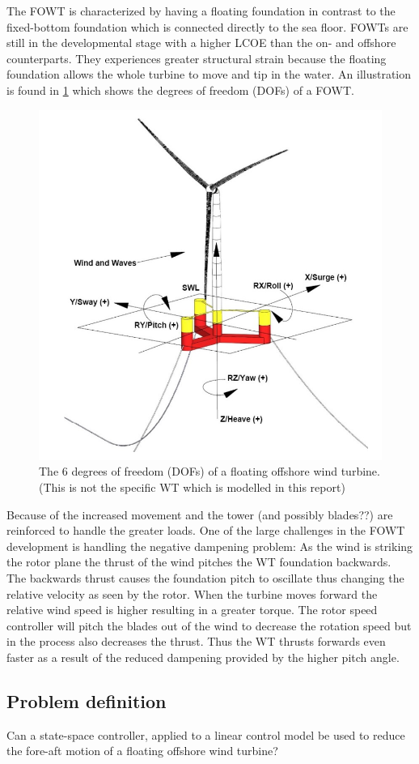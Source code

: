 The FOWT is characterized by having a floating foundation in contrast to the fixed-bottom foundation which is connected directly to the sea floor. FOWTs are still in the developmental stage with a higher LCOE than the on- and offshore counterparts. They experiences greater structural strain because the floating foundation allows the whole turbine to move and tip in the water. An illustration is found in \cref{fig:fowt_coordinates} which shows the degrees of freedom (DOFs) of a FOWT. 
\begin{figure}[h]
	\centering
	\includegraphics[width=0.55\linewidth]{Graphics/FOWTcoordinates.png}
	\caption{The 6 degrees of freedom (DOFs) of a floating offshore wind turbine. (This is not the specific WT which is modelled in this report) \cite{Vanelli2021}}
	\label{fig:fowt_coordinates}
\end{figure}
Because of the increased movement and the tower (and possibly blades??) are reinforced to handle the greater loads. One of the large challenges in the FOWT development is handling the negative dampening problem: As the wind is striking the rotor plane the thrust of the wind pitches the WT foundation backwards. The backwards thrust causes the foundation pitch to oscillate thus changing the relative velocity as seen by the rotor. When the turbine moves forward the relative wind speed is higher resulting in a greater torque. The rotor speed controller will pitch the blades out of the wind to decrease the rotation speed but in the process also decreases the thrust. Thus the WT thrusts forwards even faster as a result of the reduced dampening provided by the higher pitch angle.



\subsection{Problem definition}
Can a state-space controller, applied to a linear control model be used to reduce the fore-aft motion of a floating offshore wind turbine?


